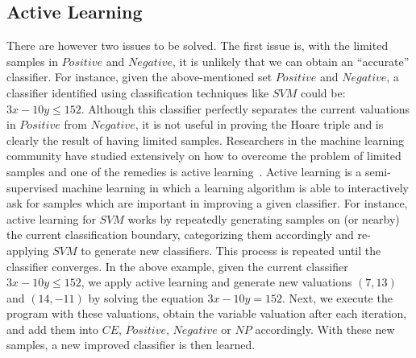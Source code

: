 \subsection{Active Learning}
There are however two issues to be solved.
The first issue is, with the limited samples in $Positive$ and $Negative$,
it is unlikely that we can obtain an ``accurate'' classifier.
For instance, given the above-mentioned set $Positive$ and $Negative$,
a classifier identified using classification techniques like $SVM$ could be: $3x-10y \leq 152$. %
Although this classifier perfectly separates the current valuations in $Positive$ from $Negative$,
it is not useful in proving the Hoare triple and is clearly the result of having limited samples.
Researchers in the machine learning community have studied extensively on how to overcome the problem of limited samples and one of the remedies is active learning~\cite{DBLP:series/synthesis/2012Settles}.
Active learning is a semi-supervised machine learning in which a learning algorithm is able to interactively ask for samples which are important in improving a given classifier.
For instance, active learning for $SVM$ works by repeatedly generating samples on (or nearby) the current classification boundary,
categorizing them accordingly and re-applying $SVM$ to generate new classifiers.
This process is repeated until the classifier converges.
%
In the above example, given the current classifier $3x-10y \leq 152$, we apply active learning
and generate new valuations $(7, 13)$ and $(14, -11)$ %
by solving the equation $3x-10y = 152$. %
Next, we execute the program with these valuations,
obtain the variable valuation after each iteration, and add them into $\mathit{CE}$, $\mathit{Positive}$, $\mathit{Negative}$ or $\mathit{NP}$ accordingly.
With these new samples, a new improved classifier is then learned.

